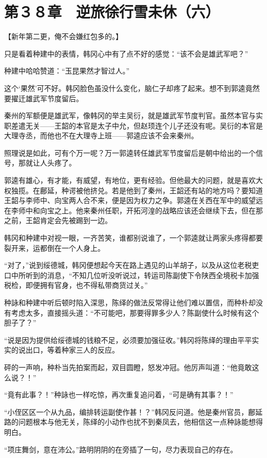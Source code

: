 \section{第３８章　逆旅徐行雪未休（六）}

【新年第二更，俺不会嫌红包多的。】

只是看着种建中的表情，韩冈心中有了点不好的感觉：“该不会是雄武军吧？”

种建中哈哈赞道：“玉昆果然才智过人。”

这个‘果然’可不好。韩冈脸色虽没什么变化，脑仁子却疼了起来。想不到郭逵竟然要擢迁雄武军节度留后。

秦州的军额便是雄武军，像韩冈的举主吴衍，就是雄武军节度判官。虽然本官与实职差遣无关——王韶的本官是太子中允，但赵顼连个儿子还没有呢。吴衍的本官是大理寺丞，而他也不在大理寺上班——郭逵应该不会来秦州。

照理说是如此，可有个万一呢？万一郭逵转任雄武军节度留后是朝中给出的一个信号，那就让人头疼了。

郭逵有雄心，有才能，有威望，有地位，更有经验。但他最大的问题，就是喜欢大权独揽。在鄜延，种谔被他挤兑。若是他到了秦州，王韶还有站的地方吗？要知道王韶与李师中、向宝两人合不来，便是因为权力之争。郭逵在关西在军中的威望远在李师中和向宝之上。他来秦州任职，开拓河湟的战略应该还会继续下去，但在那之前，王韶肯定会先被踢到一边。

韩冈和种建中对视一眼，一齐苦笑，谁都别说谁了，一个郭逵就让两家头疼得都要裂开来，运都倒在一个人身上。

“对了，”说到绥德城，韩冈便想起今天在路上遇见的山羊胡子，以及从这位老税吏口中所听到的消息，“不知几位听没听说过，转运司陈副使下令陕西全境税卡加强税检，即便拥有官身，也不得私带商货过关。”

种詠和种建中听后顿时陷入深思，陈绎的做法反常得让他们难以置信，而种朴却没有考虑太多，直接摇头道：“不可能吧，那要得罪多少人？陈副使什么时候有这个胆子了？”

“说是因为提供给绥德城的钱粮不足，必须要加强征收。”韩冈将陈绎的理由平平实实的说出口，等着种家三人的反应。

砰的一声响，种朴当先拍案而起，双目圆瞪，怒发冲冠。他厉声叫道：“他竟敢这么说？！”

“竟有此事？！”种詠也一样吃惊，再次重复追问着，“可是确有其事？！”

“小侄区区一个从九品，编排转运副使作甚！？”韩冈反问道。他是秦州官员，鄜延路的问题根本与他无关，陈绎的小动作也扰不到秦凤去，他相信这一点种詠能想得明白。

“项庄舞剑，意在沛公。”路明阴阴的在旁插了一句，尽力表现自己的存在。

